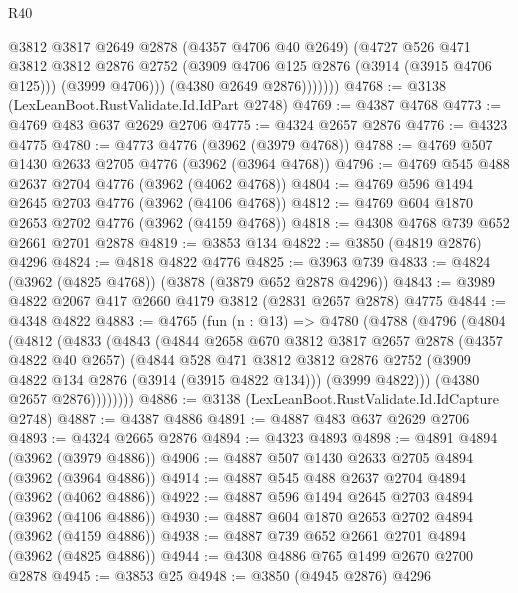 \begin{lexlean}{R40}
\begin{coremodule}
                  @3812
                  @3817
                  @2649
                  @2878
                  (@4357 @4706 @40 @2649)
                  (@4727
                    @526
                    @471
                    @3812
                    @3812
                    @2876
                    @2752
                    (@3909 @4706 @125 @2876 (@3914 (@3915 @4706 @125)))
                    (@3999 @4706)))
                (@4380 @2649 @2876)))))))
@4768 := @3138 (LexLeanBoot.RustValidate.Id.IdPart @2748)
@4769 := @4387 @4768
@4773 := @4769 @483 @637 @2629 @2706
@4775 := @4324 @2657 @2876
@4776 := @4323 @4775
@4780 := @4773 @4776 (@3962 (@3979 @4768))
@4788 := @4769 @507 @1430 @2633 @2705 @4776 (@3962 (@3964 @4768))
@4796 := @4769 @545 @488 @2637 @2704 @4776 (@3962 (@4062 @4768))
@4804 := @4769 @596 @1494 @2645 @2703 @4776 (@3962 (@4106 @4768))
@4812 := @4769 @604 @1870 @2653 @2702 @4776 (@3962 (@4159 @4768))
@4818 := @4308 @4768 @739 @652 @2661 @2701 @2878
@4819 := @3853 @134
@4822 := @3850 (@4819 @2876) @4296
@4824 := @4818 @4822 @4776
@4825 := @3963 @739
@4833 := @4824 (@3962 (@4825 @4768)) (@3878 (@3879 @652 @2878 @4296))
@4843 := @3989 @4822 @2067 @417 @2660 @4179 @3812 (@2831 @2657 @2878) @4775
@4844 := @4348 @4822
@4883 := @4765
    (fun (n : @13) =>
    @4780
      (@4788
        (@4796
          (@4804
            (@4812
              (@4833
                (@4843
                  (@4844
                    @2658
                    @670
                    @3812
                    @3817
                    @2657
                    @2878
                    (@4357 @4822 @40 @2657)
                    (@4844
                      @528
                      @471
                      @3812
                      @3812
                      @2876
                      @2752
                      (@3909 @4822 @134 @2876 (@3914 (@3915 @4822 @134)))
                      (@3999 @4822)))
                  (@4380 @2657 @2876))))))))
@4886 := @3138 (LexLeanBoot.RustValidate.Id.IdCapture @2748)
@4887 := @4387 @4886
@4891 := @4887 @483 @637 @2629 @2706
@4893 := @4324 @2665 @2876
@4894 := @4323 @4893
@4898 := @4891 @4894 (@3962 (@3979 @4886))
@4906 := @4887 @507 @1430 @2633 @2705 @4894 (@3962 (@3964 @4886))
@4914 := @4887 @545 @488 @2637 @2704 @4894 (@3962 (@4062 @4886))
@4922 := @4887 @596 @1494 @2645 @2703 @4894 (@3962 (@4106 @4886))
@4930 := @4887 @604 @1870 @2653 @2702 @4894 (@3962 (@4159 @4886))
@4938 := @4887 @739 @652 @2661 @2701 @4894 (@3962 (@4825 @4886))
@4944 := @4308 @4886 @765 @1499 @2670 @2700 @2878
@4945 := @3853 @25
@4948 := @3850 (@4945 @2876) @4296

\end{coremodule}
\end{lexlean}
